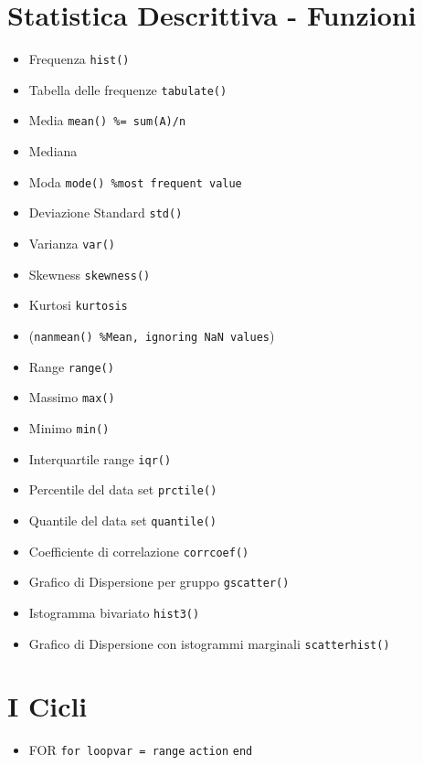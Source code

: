 \documentclass{article}
\begin{document}
\section{Statistica Descrittiva - Funzioni}
\begin{itemize}
    \item Frequenza
    \subitem \texttt{hist()}
    \item Tabella delle frequenze
    \subitem \texttt{tabulate()}
    \item Media
    \subitem \texttt{mean() \%= sum(A)/n}
    \item Mediana
    \item Moda
    \subitem \texttt{mode() \%most frequent value}
    \item Deviazione Standard
    \subitem \texttt{std()}
    \item Varianza
    \subitem \texttt{var()}
    \item Skewness
    \subitem \texttt{skewness()}
    \item Kurtosi
    \subitem \texttt{kurtosis}
    \item (\texttt{nanmean() \%Mean, ignoring NaN values})
    \item Range
    \subitem \texttt{range()}
    \item Massimo
    \subitem \texttt{max()}
    \item Minimo
    \subitem \texttt{min()}
    \item Interquartile range
    \subitem \texttt{iqr()}
    \item Percentile del data set
    \subitem \texttt{prctile()}
    \item Quantile del data set
    \subitem \texttt{quantile()}
    \item Coefficiente di correlazione
    \subitem \texttt{corrcoef()}
    \item Grafico di Dispersione per gruppo
    \subsubitem \texttt{gscatter()}
    \item Istogramma bivariato
    \subsubitem \texttt{hist3()}
    \item Grafico di Dispersione con istogrammi marginali
    \subsubitem \texttt{scatterhist()}
\end{itemize}

\section{I Cicli}
\begin{itemize}
    \item FOR
    \subitem \texttt{for loopvar = range}
    \subsubitem \texttt{action}
    \subitem \texttt{end}
\end{itemize}
\end{document}
